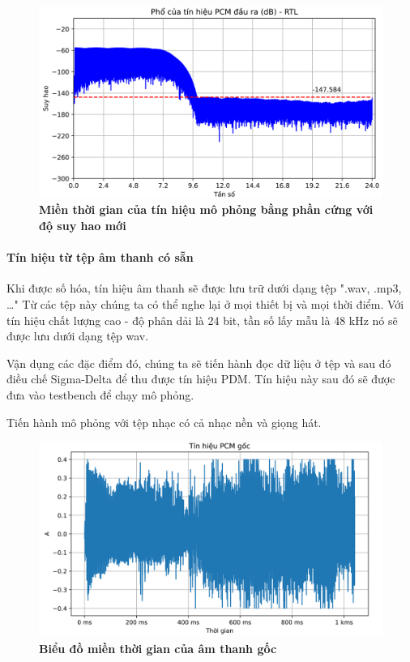 \begin{figure}[H]
    \centering
    \includegraphics[width=12cm]{Images/Chuong4/tb/sim/sin_2_psd_h.png}
    \caption[Miền thời gian của tín hiệu mô phỏng bằng phần cứng với độ suy hao mới]{\bfseries \fontsize{12pt}{0pt}\selectfont Miền thời gian của tín hiệu mô phỏng bằng phần cứng với độ suy hao mới}
    \label{sin_2_psd_h}
\end{figure}

\paragraph{Tín hiệu từ tệp âm thanh có sẵn}

Khi được số hóa, tín hiệu âm thanh sẽ được lưu trữ dưới dạng tệp ".wav, .mp3, \ldots" Từ các tệp này chúng ta có thể nghe lại ở mọi thiết bị và mọi thời điểm. Với tín hiệu chất lượng cao - độ phân dải là 24 bit, tần số lấy mẫu là 48 kHz nó sẽ được lưu dưới dạng tệp wav.

Vận dụng các đặc điểm đó, chúng ta sẽ tiến hành đọc dữ liệu ở tệp và sau đó điều chế Sigma-Delta để thu được tín hiệu PDM. Tín hiệu này sau đó sẽ được đưa vào testbench để chạy mô phỏng.

Tiến hành mô phỏng với tệp nhạc có cả nhạc nền và giọng hát.

\begin{figure}[H]
    \centering
    \includegraphics[width=14cm]{Images/Chuong4/tb/wav/vldd2_2.png}
    \caption[Biểu đồ miền thời gian của âm thanh gốc]{\bfseries \fontsize{12pt}{0pt}\selectfont Biểu đồ miền thời gian của âm thanh gốc}
    \label{vldd2_2}
\end{figure}

